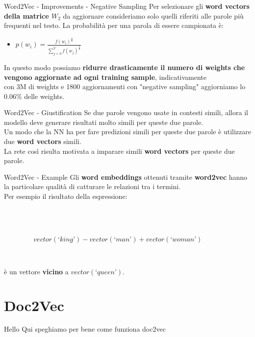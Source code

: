 \documentclass[british]{beamer}
\begin{document}
\begin{frame}{Word2Vec - Improvements - Negative Sampling}
	Per selezionare gli \textbf{word vectors della matrice \(W_2\)} da aggiornare consideriamo solo quelli riferiti alle parole pi\`{u} frequenti nel testo.
	La probabilit\`{a} per una parola di essere campionata \`{e}:
	\begin{itemize}
		\item \(p(w_i) = \frac{f(w_i)^\frac{3}{4}}{\sum_{j=0}^{V} f(w_j)^\frac{3}{4}}\)
	\end{itemize}
	In questo modo possiamo \textbf{ridurre drasticamente il numero di weights che vengono aggiornate ad ogni training sample}, indicativamente \\con 3M di weights e 1800 aggiornamenti con "negative sampling" aggiorniamo lo 0.06\% delle weights.
\end{frame}

\begin{frame}{Word2Vec - Giustification}
	Se due parole vengono usate in contesti simili, allora il modello deve generare risultati molto simili per queste due parole.\\
	Un modo che la NN ha per fare predizioni simili per queste due parole \`{e} utilizzare due \textbf{word vectors} simili.\\
	La rete cos\`{i} risulta motivata a imparare simili \textbf{word vectors} per queste due parole.
\end{frame}

\begin{frame}{Word2Vec - Example}
	Gli \textbf{word embeddings} ottenuti tramite \textbf{word2vec} hanno la particolare qualit\`{a} di catturare le relazioni tra i termini.\\
	Per esempio il risultato della espressione:
	\begin{columns}
		\begin{column}{0.15\textwidth}
			
		\end{column}
		\begin{column}{0.7\textwidth}
			\\~\\
			\(vector(‘king’) - vector(‘man’) + vector(‘woman’)\)
			\\~\\
		\end{column}
		\begin{column}{0.15\textwidth}
			
		\end{column}
	\end{columns}
	\`{e} un vettore \textbf{vicino} a \(vector(‘queen’)\).
\end{frame}

\section{Doc2Vec}

\begin{frame}{Hello}
	Qui speghiamo per bene come funziona doc2vec
\end{frame}
\end{document}
